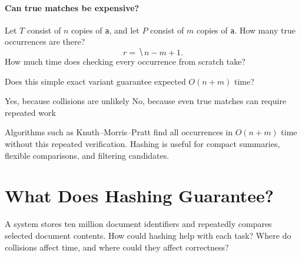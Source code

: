 \documentclass[11pt]{article}
\begin{document}
\paragraph{Can true matches be expensive?}
Let $T$ consist of $n$ copies of \texttt{a}, and let $P$ consist of $m$ copies
of \texttt{a}. How many true occurrences are there?
\begin{equation*}
    r=\hide{n-m+1}.
\end{equation*}
How much time does checking every occurrence from scratch take?
\vs{.8cm}

\begin{Qu}
    Does this simple exact variant guarantee expected $O(n+m)$ time?
    \begin{itemize}
        \aitem Yes, because collisions are unlikely
        \bitem No, because even true matches can require repeated work
    \end{itemize}
\end{Qu}

\vfill
Algorithms such as Knuth--Morris--Pratt find all occurrences in $O(n+m)$ time
without this repeated verification. Hashing is useful for compact summaries,
flexible comparisons, and filtering candidates.

\newpage
\section{What Does Hashing Guarantee?}
\begin{Qu}
    A system stores ten million document identifiers and repeatedly compares
    selected document contents. How could hashing help with each task?
    Where do collisions affect time, and where could they affect correctness?
\end{Qu}
\vs{1.5cm}
\end{document}
